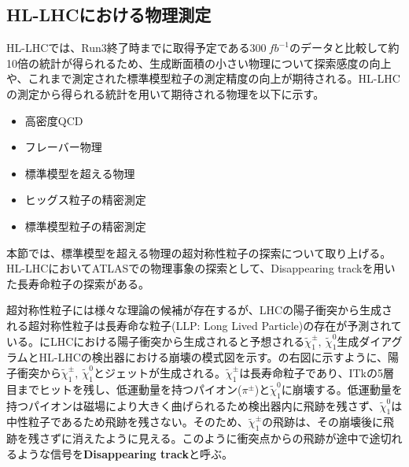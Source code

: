 \subsection{HL-LHCにおける物理測定}
\label{sec:hl-lhc-physics}
HL-LHCでは、Run3終了時までに取得予定である$300\ \si{fb^{-1}}$のデータと比較して約10倍の統計が得られるため、生成断面積の小さい物理について探索感度の向上や、これまで測定された標準模型粒子の測定精度の向上が期待される。HL-LHCの測定から得られる統計を用いて期待される物理を以下に示す。
\begin{itemize}
  \item 高密度QCD \cite{HLQCD}
  \item フレーバー物理 \cite{HLflavor}
  \item 標準模型を超える物理 \cite{HLBSM}
  \item ヒッグス粒子の精密測定 \cite{HLHIGGS}
  \item 標準模型粒子の精密測定 \cite{HLSM}
\end{itemize}
本節では、標準模型を超える物理の超対称性粒子の探索について取り上げる。HL-LHCにおいてATLASでの物理事象の探索として、Disappearing trackを用いた長寿命粒子の探索がある。

超対称性粒子には様々な理論の候補が存在するが、LHCの陽子衝突から生成される超対称性粒子は長寿命な粒子(LLP: Long Lived Particle)の存在が予測されている。にLHCにおける陽子衝突から生成されると予想される$\tilde{\chi}_1^{\pm},\ \tilde{\chi}_1^0$生成ダイアグラムとHL-LHCの検出器における崩壊の模式図を示す。の右図に示すように、陽子衝突から$\tilde{\chi}_1^{\pm},\ \tilde{\chi}_1^0$とジェットが生成される。$\tilde{\chi}_1^{\pm}$は長寿命粒子であり、ITkの5層目までヒットを残し、低運動量を持つパイオン($\pi^{\pm}$)と$\tilde{\chi}_1^0$に崩壊する。低運動量を持つパイオンは磁場により大きく曲げられるため検出器内に飛跡を残さず、$\tilde{\chi}_1^0$は中性粒子であるため飛跡を残さない。そのため、$\tilde{\chi}_1^{\pm}$の飛跡は、その崩壊後に飛跡を残さずに消えたように見える。このように衝突点からの飛跡が途中で途切れるような信号を\textbf{Disappearing track}と呼ぶ。

